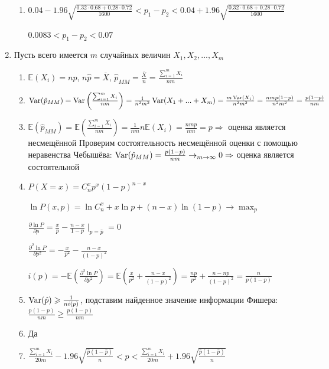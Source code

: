 \documentclass[12pt, a4paper]{article}\usepackage[]{graphicx}\usepackage[]{color}
\begin{document}
\begin{enumerate}
\begin{enumerate}
								\item $0.04 -1.96 \sqrt{\frac{0.32\cdot0.68+0.28\cdot0.72}{1600}} < p_1 - p_2 < 0.04 +1.96 \sqrt{\frac{0.32\cdot0.68+0.28\cdot0.72}{1600}} $

								$0.0083 < p_1 - p_2 < 0.07$
							\end{enumerate}

							\item Пусть всего имеется $m$ случайных величин $X_1, X_2, ... , X_m $
							\begin{enumerate}
								\item $\mathbb{E}(X_i) = np$, $n\hat{p} = \overline{X}$, $\hat{p}_{MM} = \frac{\overline{X}}{n} = \frac{\sum_{i=1}^m X_i}{nm}$
								\item $\operatorname{Var}(\hat{p}_{MM}) = \operatorname{Var}\left(\frac{\sum_{i=1}^m X_i}{nm}\right) = \frac{1}{n^2m^2} \operatorname{Var}(X_1 + ... + X_m) = \frac{m \operatorname{Var}(X_i)}{n^2m^2} = \frac{nmp(1-p)}{n^2m^2} = \frac{p(1-p)}{nm}$
								\item $\mathbb{E}(\hat{p}_{MM}) = \mathbb{E}\left(\frac{\sum_{i=1}^m X_i}{nm}\right) = \frac{1}{nm}n\mathbb{E}(X_i) = \frac{nmp}{nm} = p \Rightarrow$ оценка является несмещённой
								Проверим состоятельность несмещённой оценки с помощью неравенства Чебышёва:
								$\operatorname{Var}(\hat{p}_{MM}) = \frac{p(1-p)}{nm} \to_{m\to\infty} 0 \Rightarrow$ оценка является состоятельной
								\item $P(X=x) = C^x_n p^x (1-p)^{n-x}$

								$\ln P(x, p) = \ln C^x_n + x\ln p + (n-x) \ln (1-p) \to \max_p$

								$\frac{\partial \ln P}{\partial p} = \frac{x}{p} - \frac{n-x}{1-p} \mid_{p=\hat{p}} = 0$

								$\frac{\partial^2 \ln P}{\partial p^2} = -\frac{x}{p^2} - \frac{n-x}{(1-p)^2}$

								$i(p) = -\mathbb{E}\left(\frac{\partial^2 \ln P}{\partial p^2}\right) = \mathbb{E}\left(\frac{x}{p^2} + \frac{n-x}{(1-p)^2}\right) = \frac{np}{p^2} + \frac{n-np}{(1-p)^2} = \frac{n}{p(1-p)}$

								\item $\operatorname{Var}(\hat{p}) \geqslant \frac{1}{ni(p)}$, подставим найденное значение информации Фишера: $\frac{p(1-p)}{nm} \geq \frac{p(1-p)}{nm}$

								\item Да

								\item $\frac{\sum_{i=1}^m X_i}{20m} - 1.96 \sqrt{\frac{\hat{p}(1-\hat{p})}{n}}  < p < \frac{\sum_{i=1}^m X_i}{20m} + 1.96 \sqrt{\frac{\hat{p}(1-\hat{p})}{n}} $
							\end{enumerate}


\end{enumerate}
\end{document}
